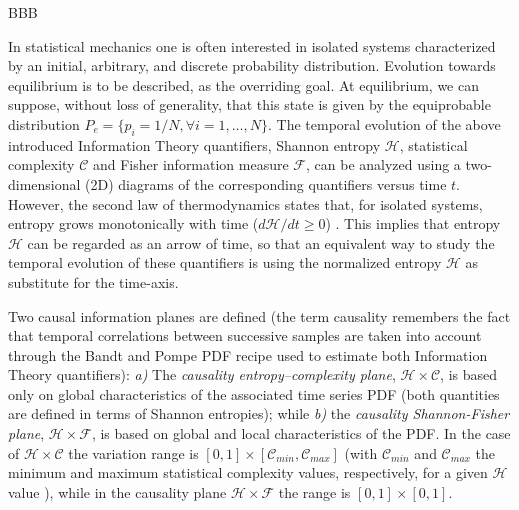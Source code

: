 BBB

In statistical mechanics one is often interested in isolated systems  characterized by an initial, arbitrary,
and discrete probability distribution. 
Evolution towards equilibrium is to be described, as the overriding goal.
At equilibrium, we can suppose, without loss of generality, that this state is given by the equiprobable 
distribution $P_e = \{ p_i = 1/N, \forall i=1, \ldots , N \}$.
The temporal evolution of the above introduced Information Theory quantifiers, Shannon entropy $\mathcal H$, 
statistical complexity $\mathcal C$ and Fisher information measure $\mathcal F$, can be analyzed using a 
two-dimensional (2D) diagrams of the corresponding quantifiers versus time $t$. 
However, the second law of thermodynamics states that, for isolated systems, entropy grows monotonically
with time ($d{\mathcal H}/dt \geq 0$) \cite{Plastino1996}. 
This implies that entropy ${\mathcal H}$ can be regarded as an arrow of time, so that an equivalent way
to study the temporal evolution of these quantifiers is using the normalized entropy ${\mathcal H}$ as 
substitute for the time-axis.

Two causal information planes are defined (the term causality remembers the fact that temporal correlations 
between successive samples are taken into account through the Bandt and Pompe PDF recipe used to
estimate both Information Theory quantifiers):
{\it a)\/} The {\it causality entropy--complexity plane\/}, ${\mathcal H} \times {\mathcal C}$, is based 
only on global characteristics of the associated time series PDF (both quantities are defined in terms of 
Shannon entropies); while 
{\it b)\/} the {\it causality Shannon-Fisher plane\/}, ${\mathcal H} \times {\mathcal F}$, is based on 
global and local characteristics of the PDF.
In the case of ${\mathcal H} \times {\mathcal C}$ the variation range is $[0, 1] \times [{\mathcal C}_{min}, 
{\mathcal C}_{max}]$ (with ${\mathcal C}_{min}$ and ${\mathcal C}_{max}$ the minimum and maximum statistical 
complexity values, respectively, for a given ${\mathcal H}$ value \cite{Martin2006}), while in the causality 
plane ${\mathcal H} \times {\mathcal F}$ the range is $[0, 1]\times [0, 1]$.

